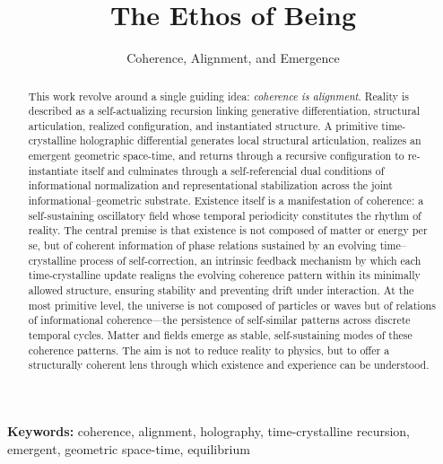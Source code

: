 \documentclass[11pt]{article}
\title{The Ethos of Being}
\subtitle{Coherence, Alignment, and Emergence}
\author{}
\date{}
\begin{document}
\maketitle
\vspace{-6em}

\begin{abstract}
This work revolve around a single guiding idea: \emph{coherence is alignment}. Reality is described as a self-actualizing recursion linking generative differentiation, structural articulation, realized configuration, and instantiated structure. A primitive  time-crystalline holographic differential generates local structural articulation, realizes an emergent geometric space-time, and returns through a recursive configuration to re-instantiate itself and culminates through a self-referencial dual conditions of informational normalization and representational stabilization across the joint informational--geometric substrate. 
Existence itself is a manifestation of coherence: a self-sustaining oscillatory field whose temporal periodicity constitutes the rhythm of reality. The central premise is that existence is not composed of matter or energy per se, but of coherent information of phase relations sustained by an evolving time–crystalline process of
self-correction, an intrinsic feedback mechanism by which each time-crystalline update realigns the evolving coherence pattern within its minimally allowed structure, ensuring stability and preventing drift under interaction. At the most primitive level, the universe is not composed of particles or waves but of relations of informational coherence—the persistence of self-similar patterns across discrete temporal cycles. Matter and fields emerge as stable, self-sustaining modes of these coherence patterns. The aim is not to reduce reality to physics, but to offer a structurally coherent lens through which existence and experience can be understood.
\end{abstract}

\vspace{0.5em}
\noindent\textbf{Keywords:} coherence, alignment, holography, time-crystalline recursion, emergent, geometric space-time, equilibrium

\end{document}
